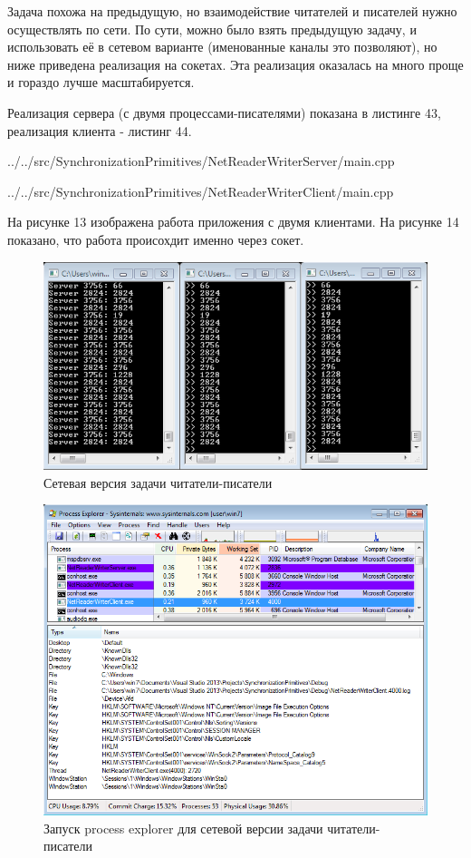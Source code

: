 \documentclass[a4paper, 12pt]{article}		%
\begin{document}
Задача похожа на предыдущую, но взаимодействие читателей и писателей нужно осуществлять по сети. По сути, можно было взять предыдущую задачу, и использовать её в сетевом варианте (именованные каналы это позволяют), но ниже приведена реализация на сокетах. Эта реализация оказалась на много проще и гораздо лучше масштабируется.

Реализация сервера (с двумя процессами-писателями) показана в листинге 43, реализация клиента - листинг 44.


{../../src/SynchronizationPrimitives/NetReaderWriterServer/main.cpp}


{../../src/SynchronizationPrimitives/NetReaderWriterClient/main.cpp}

На рисунке 13 изображена работа приложения с двумя клиентами. На рисунке 14 показано, что работа происохдит именно через сокет.
\newpage

\begin{figure}[h!]
\centering
\includegraphics[scale=0.7]{res/013}
\caption{Сетевая версия задачи читатели-писатели}
\end{figure}

\begin{figure}[h!]
\centering
\includegraphics[scale=0.6]{res/pe_13}
\caption{Запуск process explorer для сетевой версии задачи читатели-писатели}
\end{figure}
\end{document}
